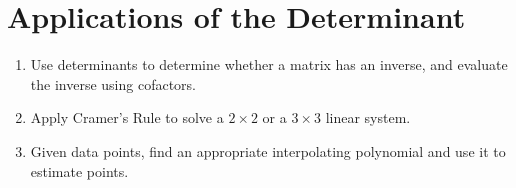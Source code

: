 \section{Applications of the Determinant}

\begin{outcome}
\begin{enumerate}
\item[A.] Use determinants to determine whether a matrix has an inverse, and evaluate the inverse using cofactors. 

\item[A.] Apply Cramer's Rule to solve a $2\times 2$ or a $3\times 3$ linear
system.

\item[C.] Given data points, find an appropriate interpolating polynomial and use it to estimate points. 

\end{enumerate}
\end{outcome}
